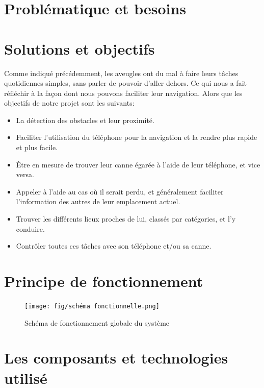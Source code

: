 
\section{Problématique et besoins}


\section{Solutions et objectifs}

Comme indiqué précédemment, les aveugles ont du mal à faire leurs tâches quotidiennes simples, sans parler de pouvoir d'aller dehors. Ce qui nous a fait réfléchir à la façon dont nous pouvons faciliter leur navigation. Alors que les objectifs de notre projet sont les suivants:
\begin{itemize}
    \item La détection des obstacles et leur proximité.
    \item Faciliter l’utilisation du téléphone pour la navigation et la rendre plus rapide et plus facile.
    \item Être en mesure de trouver leur canne égarée à l’aide de leur téléphone, et vice versa.
    \item Appeler à l’aide au cas où il serait perdu, et généralement faciliter l’information des autres de leur emplacement actuel.
    \item Trouver les différents lieux proches de lui, classés par catégories, et l’y conduire.
    \item Contrôler toutes ces tâches avec son téléphone et/ou sa canne.
\end{itemize}

\section{Principe de fonctionnement}


\begin{figure}[!ht]
    \centering
    \texttt{[image: fig/schéma fonctionnelle.png]}
    \caption{Schéma de fonctionnement globale du système}
\end{figure}

\FloatBarrier


\section{Les composants et technologies utilisé}

